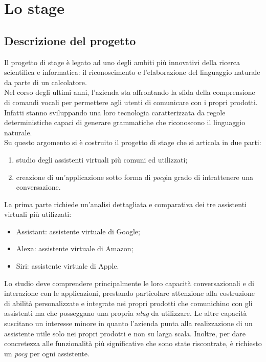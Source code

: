 
\chapter{Lo stage}
\label{cap:lo-stage}


\section{Descrizione del progetto}
Il progetto di stage è legato ad uno degli ambiti più innovativi della ricerca scientifica e informatica: il riconoscimento e l'elaborazione del linguaggio naturale da parte di un calcolatore. \\
Nel corso degli ultimi anni, l'azienda sta affrontando la sfida della comprensione di comandi vocali per permettere agli utenti di comunicare con i propri prodotti. Infatti stanno sviluppando una loro tecnologia caratterizzata da regole deterministiche capaci di generare grammatiche che riconoscono il linguaggio naturale. \\ Su questo argomento si è costruito il progetto di stage che si articola in due parti:
\begin{enumerate}
	\item studio degli assistenti virtuali più comuni ed utilizzati;
	\item creazione di un'applicazione sotto forma di \emph{\gls{pocg}}\glsfirstoccur in grado di intrattenere una conversazione.
\end{enumerate}
La prima parte richiede un'analisi dettagliata e comparativa dei tre assistenti virtuali più utilizzati:
\begin{itemize}
	\item Assistant: assistente virtuale di Google;
	\item Alexa: assistente virtuale di Amazon;
	\item Siri: assistente virtuale di Apple.
\end{itemize}
Lo studio deve comprendere principalmente le loro capacità conversazionali e di interazione con le applicazioni, prestando particolare attenzione alla costruzione di abilità personalizzate e integrate nei propri prodotti che comunichino con gli assistenti ma che posseggano una propria \emph{\gls{nlug}} da utilizzare. Le altre capacità suscitano un interesse minore in quanto l'azienda punta alla realizzazione di un assistente utile solo nei propri prodotti e non su larga scala. Inoltre, per dare concretezza alle funzionalità più significative che sono state riscontrate, è richiesto un \emph{\gls{pocg}} per ogni assistente.\\
